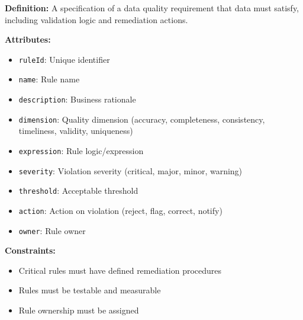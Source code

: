\documentclass[11pt,letterpaper]{article}
\begin{document}
\begin{definitionbox}
\textbf{Definition:} A specification of a data quality requirement that data must satisfy, including validation logic and remediation actions.

\textbf{Attributes:}
\begin{itemize}[nosep]
    \item \texttt{ruleId}: Unique identifier
    \item \texttt{name}: Rule name
    \item \texttt{description}: Business rationale
    \item \texttt{dimension}: Quality dimension (accuracy, completeness, consistency, timeliness, validity, uniqueness)
    \item \texttt{expression}: Rule logic/expression
    \item \texttt{severity}: Violation severity (critical, major, minor, warning)
    \item \texttt{threshold}: Acceptable threshold
    \item \texttt{action}: Action on violation (reject, flag, correct, notify)
    \item \texttt{owner}: Rule owner
\end{itemize}

\textbf{Constraints:}
\begin{itemize}[nosep]
    \item Critical rules must have defined remediation procedures
    \item Rules must be testable and measurable
    \item Rule ownership must be assigned
\end{itemize}
\end{definitionbox}
\end{document}
